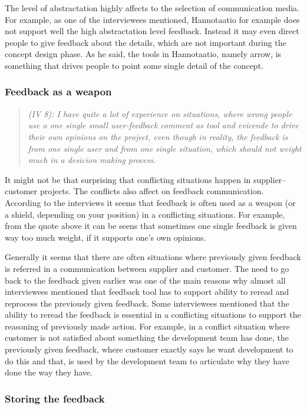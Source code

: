 \documentclass[english,12pt,a4paper,pdftex]{article}
\newcommand{\q}[2]{
\begin{quote}
\emph{(IV #1): #2}
\end{quote}}
\begin{document}
The level of abstractation highly affects to the selection of communication media. For example, as one of the interviewees mentioned, Hannotaatio for example does not support well the high abstractation level feedback. Instead it may even direct people to give feedback about the details, which are not important during the concept design phase. As he said, the tools in Hannotaatio, namely arrow, is something that drives people to point some single detail of the concept.

\subsubsection{Feedback as a weapon}

\q{8}{I have quite a lot of experience on situations, where wrong people use a one single small user-feedback comment as tool and evicende to drive their own opinions on the project, even though in reality, the feedback is from one single user and from one single situation, which should not weight much in a desicion making process.}

It might not be that surprising that conflicting situations happen in supplier--customer projects. The conflicts also affect on feedback communication. According to the interviews it seems that feedback is often used as a weapon (or a shield, depending on your position) in a conflicting situations. For example, from the quote above it can be seens that sometimes one single feedback is given way too much weight, if it supports one's own opinions.

Generally it seems that there are often situations where previously given feedback is referred in a communication between supplier and customer. The need to go back to the feedback given earlier was one of the main reasons why almost all interviewees mentioned that feedback tool has to support ability to reread and reprocess the previously given feedback. Some interviewees mentioned that the ability to reread the feedback is essential in a conflicting situations to support the reasoning of previously made action. For example, in a conflict situation where customer is not satisfied about something the development team has done, the previously given feedback, where customer exactly says he want development to do this and that, is used by the development team to articulate why they have done the way they have.

\subsubsection{Storing the feedback}
\end{document}
